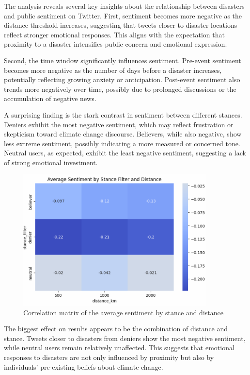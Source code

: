 \documentclass[pdflatex,sn-mathphys-num]{sn-jnl}%
\theoremstyle{thmstyleone}%
\theoremstyle{thmstyletwo}%
\theoremstyle{thmstylethree}%
\begin{document}
The analysis reveals several key insights about the relationship between disasters and public sentiment on Twitter. First, sentiment becomes more negative as the distance threshold increases, suggesting that tweets closer to disaster locations reflect stronger emotional responses. This aligns with the expectation that proximity to a disaster intensifies public concern and emotional expression.



Second, the time window significantly influences sentiment. Pre-event sentiment becomes more negative as the number of days before a disaster increases, potentially reflecting growing anxiety or anticipation. Post-event sentiment also trends more negatively over time, possibly due to prolonged discussions or the accumulation of negative news.

A surprising finding is the stark contrast in sentiment between different stances. Deniers exhibit the most negative sentiment, which may reflect frustration or skepticism toward climate change discourse. Believers, while also negative, show less extreme sentiment, possibly indicating a more measured or concerned tone. Neutral users, as expected, exhibit the least negative sentiment, suggesting a lack of strong emotional investment.

\begin{figure}[H]
\centering
\includegraphics[width=10cm]{images/climatechangepulse9.PNG}
\caption{Correlation matrix of the average sentiment by stance and distance}
\end{figure}

The biggest effect on results appears to be the combination of distance and stance. Tweets closer to disasters from deniers show the most negative sentiment, while neutral users remain relatively unaffected. This suggests that emotional responses to disasters are not only influenced by proximity but also by individuals' pre-existing beliefs about climate change.
\end{document}
